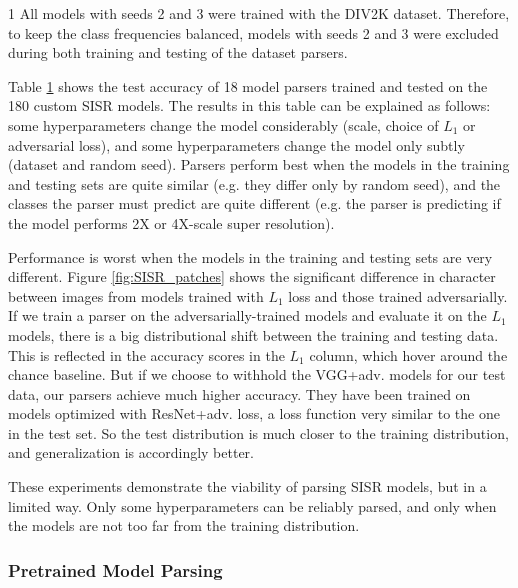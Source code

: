 \documentclass[10pt]{article} %
\begin{document}
\begin{table}[t]
\begin{threeparttable}
\begin{tabular}{c c  c  c  c  c  c  c}
\bottomrule
  \end{tabular}
  \begin{tablenotes}
  \item[1] All models with seeds 2 and 3 were trained with the DIV2K dataset. Therefore, to keep the class frequencies balanced, models with seeds 2 and 3 were excluded during both training and testing of the dataset parsers.
  \end{tablenotes}
    \end{threeparttable}
    \label{tab:parameter_classifiers}
\end{table}

Table \ref{tab:parameter_classifiers} shows the test accuracy of 18 model parsers trained and tested on the 180 custom SISR models. The results in this table can be explained as follows: some hyperparameters change the model considerably (scale, choice of $L_1$ or adversarial loss), and some hyperparameters change the model only subtly (dataset and random seed). Parsers perform best when the models in the training and testing sets are quite similar (e.g. they differ only by random seed), and the classes the parser must predict are quite different (e.g. the parser is predicting if the model performs 2X or 4X-scale super resolution).

Performance is worst when the models in the training and testing sets are very different. Figure \ref{fig:SISR_patches} shows the significant difference in character between images from models trained with $L_1$ loss and those trained adversarially. If we train a parser on the adversarially-trained models and evaluate it on the $L_1$ models, there is a big distributional shift between the training and testing data. This is reflected in the accuracy scores in the $L_1$ column, which hover around the chance baseline. But if we choose to withhold the VGG+adv. models for our test data, our parsers achieve much higher accuracy. They have been trained on models optimized with ResNet+adv. loss, a loss function very similar to the one in the test set. So the test distribution is much closer to the training distribution, and generalization is accordingly better.



These experiments demonstrate the viability of parsing SISR models, but in a limited way. Only some hyperparameters can be reliably parsed, and only when the models are not too far from the training distribution.


\subsubsection{Pretrained Model Parsing}
\end{document}

